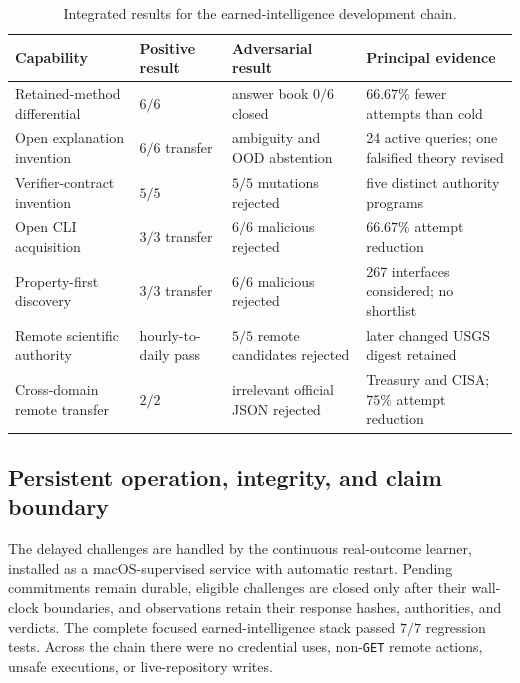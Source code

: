 \begin{table}[t]
\centering
\caption{Integrated results for the earned-intelligence development chain.}
\label{tab:earned-intelligence-chain}
\begin{tabular}{p{}p{}p{}p{}}
\toprule
Capability & Positive result & Adversarial result & Principal evidence \\
\midrule
Retained-method differential & $6/6$ & answer book $0/6$ closed & $66.67\%$ fewer attempts than cold \\
Open explanation invention & $6/6$ transfer & ambiguity and OOD abstention & 24 active queries; one falsified theory revised \\
Verifier-contract invention & $5/5$ & $5/5$ mutations rejected & five distinct authority programs \\
Open CLI acquisition & $3/3$ transfer & $6/6$ malicious rejected & $66.67\%$ attempt reduction \\
Property-first discovery & $3/3$ transfer & $6/6$ malicious rejected & 267 interfaces considered; no shortlist \\
Remote scientific authority & hourly-to-daily pass & $5/5$ remote candidates rejected & later changed USGS digest retained \\
Cross-domain remote transfer & $2/2$ & irrelevant official JSON rejected & Treasury and CISA; $75\%$ attempt reduction \\
\bottomrule
\end{tabular}
\end{table}

\subsection{Persistent operation, integrity, and claim boundary}

The delayed challenges are handled by the continuous real-outcome learner,
installed as a macOS-supervised service with automatic restart.  Pending
commitments remain durable, eligible challenges are closed only after their
wall-clock boundaries, and observations retain their response hashes,
authorities, and verdicts.  The complete focused earned-intelligence stack
passed $7/7$ regression tests.  Across the chain there were no credential uses,
non-\texttt{GET} remote actions, unsafe executions, or live-repository writes.

